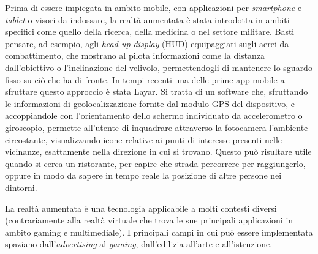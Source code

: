 Prima di essere impiegata in ambito mobile, con applicazioni per \textit{smartphone} e \textit{tablet} o visori da indossare, la realtà aumentata è stata introdotta in ambiti specifici come quello della ricerca, della medicina o nel settore militare. Basti pensare, ad esempio, agli \textit{head-up display} (HUD) equipaggiati sugli aerei da combattimento, che mostrano al pilota informazioni come la distanza dall’obiettivo o l’inclinazione del velivolo, permettendogli di mantenere lo sguardo fisso su ciò che ha di fronte.
In tempi recenti una delle prime app mobile a sfruttare questo approccio è stata Layar. Si tratta di un software che, sfruttando le informazioni di geolocalizzazione fornite dal modulo GPS del dispositivo, e accoppiandole con l’orientamento dello schermo individuato da accelerometro o giroscopio, permette all’utente di inquadrare attraverso la fotocamera l’ambiente circostante, visualizzando icone relative ai punti di interesse presenti nelle vicinanze, esattamente nella direzione in cui si trovano. Questo può risultare utile quando si cerca un ristorante, per capire che strada percorrere per raggiungerlo, oppure in modo da sapere in tempo reale la posizione di altre persone nei dintorni.

La realtà aumentata è una tecnologia applicabile a molti contesti diversi (contrariamente alla realt\`a virtuale che trova le sue principali applicazioni in ambito gaming e multimediale). I principali campi in cui pu\`o essere implementata spaziano dall'\textit{advertising} al \textit{gaming}, dall'edilizia all'arte e all'istruzione.